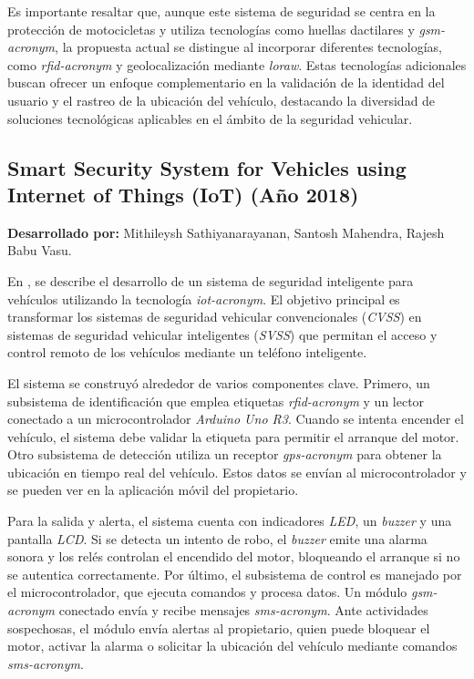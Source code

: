 Es importante resaltar que, aunque este sistema de seguridad se centra en la protección de motocicletas y utiliza tecnologías como huellas dactilares y \textit{\acrshort{gsm-acronym}}, la propuesta actual se distingue al incorporar diferentes tecnologías, como \textit{\acrshort{rfid-acronym}} y geolocalización mediante \textit{\acrshort{loraw}}. Estas tecnologías adicionales buscan ofrecer un enfoque complementario en la validación de la identidad del usuario y el rastreo de la ubicación del vehículo, destacando la diversidad de soluciones tecnológicas aplicables en el ámbito de la seguridad vehicular.

\subsection{Smart Security System for Vehicles using Internet of Things (IoT) (Año 2018)}
\textbf{Desarrollado por:} Mithileysh Sathiyanarayanan, Santosh Mahendra, Rajesh Babu Vasu.

En \cite{Sathiyanarayanan2018}, se describe el desarrollo de un sistema de seguridad inteligente para vehículos utilizando la tecnología \textit{\acrshort{iot-acronym}}. El objetivo principal es transformar los sistemas de seguridad vehicular convencionales (\textit{CVSS}) en sistemas de seguridad vehicular inteligentes (\textit{SVSS}) que permitan el acceso y control remoto de los vehículos mediante un teléfono inteligente.

El sistema se construyó alrededor de varios componentes clave. Primero, un subsistema de identificación que emplea etiquetas \textit{\acrshort{rfid-acronym}} y un lector conectado a un microcontrolador \textit{Arduino Uno R3}. Cuando se intenta encender el vehículo, el sistema debe validar la etiqueta para permitir el arranque del motor. Otro subsistema de detección utiliza un receptor \textit{\acrshort{gps-acronym}} para obtener la ubicación en tiempo real del vehículo. Estos datos se envían al microcontrolador y se pueden ver en la aplicación móvil del propietario.

Para la salida y alerta, el sistema cuenta con indicadores \textit{LED}, un \textit{buzzer} y una pantalla \textit{LCD}. Si se detecta un intento de robo, el \textit{buzzer} emite una alarma sonora y los relés controlan el encendido del motor, bloqueando el arranque si no se autentica correctamente. Por último, el subsistema de control es manejado por el microcontrolador, que ejecuta comandos y procesa datos. Un módulo \textit{\acrshort{gsm-acronym}} conectado envía y recibe mensajes \textit{\acrshort{sms-acronym}}. Ante actividades sospechosas, el módulo envía alertas al propietario, quien puede bloquear el motor, activar la alarma o solicitar la ubicación del vehículo mediante comandos \textit{\acrshort{sms-acronym}}.

